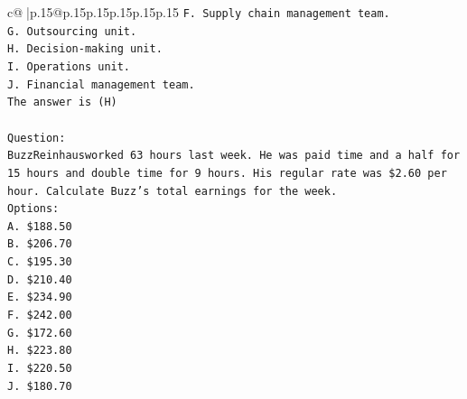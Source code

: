 \documentclass{article}
\begin{document}
{\begin{supertabular}{c@{$\;$}|p{.15\linewidth}@{}p{.15\linewidth}p{.15\linewidth}p{.15\linewidth}p{.15\linewidth}p{.15\linewidth}}
{{{\texttt{F. Supply chain management team.} \\
\texttt{G. Outsourcing unit.} \\
\texttt{H. Decision{-}making unit.} \\
\texttt{I. Operations unit.} \\
\texttt{J. Financial management team.} \\
\texttt{The answer is (H)} \\
\\ 
\texttt{Question:} \\
\texttt{BuzzReinhausworked 63 hours last week. He was paid time and a half for 15 hours and double time for 9 hours. His regular rate was \$2.60 per hour. Calculate Buzz's total earnings for the week.} \\
\texttt{Options:} \\
\texttt{A. \$188.50} \\
\texttt{B. \$206.70} \\
\texttt{C. \$195.30} \\
\texttt{D. \$210.40} \\
\texttt{E. \$234.90} \\
\texttt{F. \$242.00} \\
\texttt{G. \$172.60} \\
\texttt{H. \$223.80} \\
\texttt{I. \$220.50} \\
\texttt{J. \$180.70} \\
            }
        }
    }
     \\ \\


\end{supertabular}}
\end{document}
